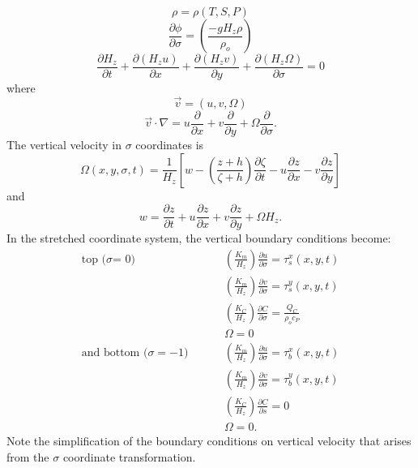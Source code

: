 \begin{equation}
  \rho = \rho(T,S,P)
\end{equation}
\begin{equation}
  \frac{\partial \phi}{\partial \sigma} = \left( \frac{-gH_z\rho}
  {\rho_o} \right)
\label{st9}
\end{equation}
\begin{equation}
  \frac{\partial H_z}{\partial t} +
  \frac{\partial (H_zu)}{\partial x} +
  \frac{\partial (H_zv)}{\partial y} +
  \frac{\partial (H_z \Omega)}{\partial \sigma} = 0
\label{st10}
\end{equation}
where
\[
  \vec{v} = (u,v,\Omega)
\]
\[
  \vec{v} \cdot \nabla = u \frac{\partial}{\partial x} + v
  \frac{\partial}{\partial y} + \Omega \frac{\partial}{\partial
  \sigma}.
\]
The vertical velocity in $\sigma$ coordinates is
\[
  \Omega (x,y,\sigma,t) = \frac{1}{H_z}
  \left[ w - \left(\frac{z+h}{\zeta+h} \right) 
  \frac{\partial \zeta}{\partial t} - u \frac{\partial z}{\partial x}
  - v \frac{\partial z}{\partial y} \right]
\]
and
\[
  w = \frac{\partial z}{\partial t} + u \frac{\partial z}{\partial x}
  + v \frac{\partial z}{\partial y} + \Omega H_z.
\]
In the stretched coordinate system, the vertical boundary conditions
become:
\[\begin{array}{rl}
  \mbox{top ($\sigma$= 0)} \hspace{1cm} & \left(\frac{K_m}{H_z}\right)
  \frac{\partial u}{\partial \sigma} = \tau^x_s (x,y,t) \\ [1.5mm]
  & \left(\frac{K_m}{H_z}\right) \frac{\partial v}{\partial \sigma}
  = \tau^y_s(x,y,t) \\[1.5mm]
  & \left(\frac{K_C}{H_z}\right) \frac{\partial C}{\partial \sigma}
  = \frac{Q_C}{\rho_o c_P}
  \\[1.5mm]
  & \Omega = 0 \\[2mm]
  \mbox{and bottom ($\sigma = -1$)} \hspace{1cm} &
  \left(\frac{K_m}{H_z}\right) \frac{\partial u}{\partial \sigma}
  = \tau^x_b (x,y,t) \\[1.5mm]
  & \left(\frac{K_m}{H_z}\right) \frac{\partial v}{\partial \sigma}
  = \tau^y_b (x,y,t) \\[1.5mm]
  & \left(\frac{K_C}{H_z}\right) \frac{\partial C}{\partial s}
  = 0 \\[1.5mm]
  & \Omega = 0.
\end{array}\]
Note the simplification of the boundary conditions on vertical
velocity that arises from the $\sigma$ coordinate transformation.

